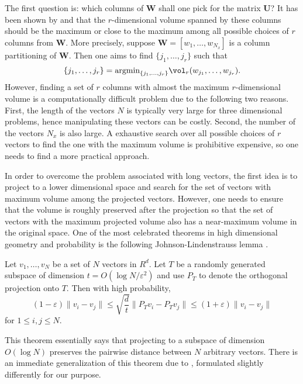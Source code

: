 The first question is: which columns of $\mathbf{W}$ shall one pick
for the matrix $\mathbf{U}$? It has been shown by \cite{Goreinov:97}
and \cite{GuEisenstat:96} that the $r$-dimensional volume spanned by
these columns should be the maximum or close to the maximum among all
possible choices of $r$ columns from $\mathbf{W}$. More precisely, suppose
$\mathbf{W} = [w_1,\ldots,w_{N_x}]$ is a column partitioning of $\mathbf{W}$. Then one aims to find
$\{j_1,\ldots,j_r\}$ such that
\begin{equation}
\{j_1,\ldots,j_r\} = \text{argmin}_{\{j_1,\ldots,j_r\}} \vol_r(w_{j_1},\ldots,w_{j_r}).
\label{eq:argmin}
\end{equation}
However, finding a set of $r$ columns with almost the maximum
$r$-dimensional volume is a computationally difficult problem due to
the following two reasons. First, the length of the vectors $N$ is
typically very large for three dimensional problems, hence
manipulating these vectors can be costly. Second, the number of the
vectors $N_x$ is also large. A exhaustive search over all possible
choices of $r$ vectors to find the one with the maximum volume is
prohibitive expensive, so one needs to find a more practical approach.

In order to overcome the problem associated with long vectors, the
first idea is to project to a lower dimensional space and search for
the set of vectors with maximum volume among the projected vectors.
However, one needs to ensure that the volume is roughly preserved
after the projection so that the set of vectors with the maximum
projected volume also has a near-maximum volume in the original space.
One of the most celebrated theorems in high dimensional geometry and
probability is the following Johnson-Lindenstrauss lemma
\cite[]{JohnsonLindenstrauss:84}.
\begin{theorem}
  Let $v_1,\ldots,v_N$ be a set of $N$ vectors in $R^d$. Let $T$ be a
  randomly generated subspace of dimension $t=O(\log N /\varepsilon^2)$ and
  use $P_T$ to denote the orthogonal projection onto $T$. Then with
  high probability,
  \[
  (1-\varepsilon) \lVert v_i-v_j \rVert \le 
  \sqrt{\frac{d}{t}}  \lVert P_T v_i-P_T v_j \rVert \le
  (1+\varepsilon) \lVert v_i-v_j \rVert
  \]
  for $1\le i,j \le N$.
\end{theorem}

This theorem essentially says that projecting to a subspace of
dimension $O(\log N)$ preserves the pairwise distance between $N$
arbitrary vectors. There is an immediate generalization of this
theorem due to \cite{Magen:2002}, formulated 
slightly differently for our purpose.

